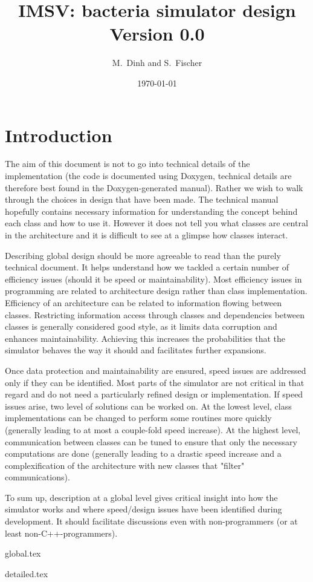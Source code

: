 \documentclass[12pt]{article}
\theoremstyle{definition}
\theoremstyle{remark}
\numberwithin{equation}{section}
\begin{document}
\normalem

\title{{IMSV}: bacteria simulator design \\ Version 0.0}%
\author{M.~Dinh and S.~Fischer}%
\date{\today}%

\newpage

\tableofcontents

\newpage

\section{Introduction}

The aim of this document is not to go into technical details of the implementation (the code is documented using Doxygen, technical details are therefore best found in the Doxygen-generated manual). Rather we wish to walk through the choices in design that have been made. The technical manual hopefully contains necessary information for understanding the concept behind each class and how to use it. However it does not tell you what classes are central in the architecture and it is difficult to see at a glimpse how classes interact.

Describing global design should be more agreeable to read than the purely technical document. It helps understand how we tackled a certain number of efficiency issues (should it be speed or maintainability). Most efficiency issues in programming are related to architecture design rather than class implementation. Efficiency of an architecture can be related to information flowing between classes. Restricting information access through classes and dependencies between classes is generally considered good style, as it limits data corruption and enhances maintainability. Achieving this increases the probabilities that the simulator behaves the way it should and facilitates further expansions.

Once data protection and maintainability are ensured, speed issues are addressed only if they can be identified. Most parts of the simulator are not critical in that regard and do not need a particularly refined design or implementation. If speed issues arise, two level of solutions can be worked on. At the lowest level, class implementations can be changed to perform some routines more quickly (generally leading to at most a couple-fold speed increase). At the highest level, communication between classes can be tuned to ensure that only the necessary computations are done (generally leading to a drastic speed increase and a complexification of the architecture with new classes that "filter" communications).

To sum up, description at a global level gives critical insight into how the simulator works and where speed/design issues have been identified during development. It should facilitate discussions even with non-programmers (or at least non-C++-programmers).

{global.tex}
\clearpage

{detailed.tex}
\clearpage
\end{document}
